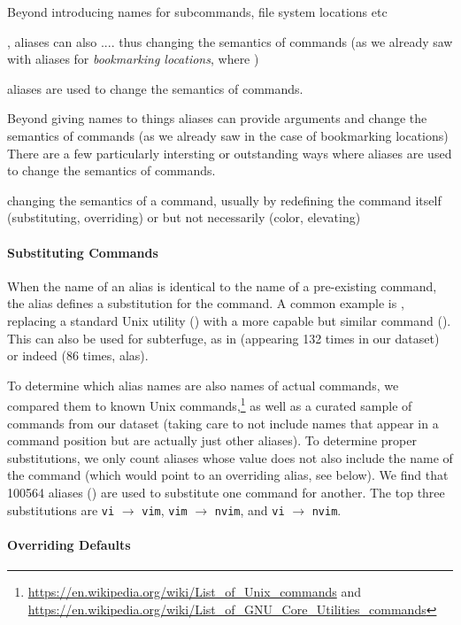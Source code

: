 Beyond introducing names for 
subcommands, file system locations etc

, aliases can also ....
thus changing the semantics of commands (as we already saw with aliases for \emph{bookmarking locations}, where )

aliases are used to change the semantics of commands.


Beyond giving names to things
aliases can provide arguments
and change the semantics of commands (as we already saw in the case of bookmarking locations)
There are a few particularly intersting or outstanding ways where aliases are used to change the semantics of commands.

\TODO changing the semantics of a command, usually by redefining the command itself (substituting, overriding) or but not necessarily (color, elevating)

\paragraph{\bf Substituting Commands}

When the name of an alias is identical to the name of a pre-existing command, the alias defines a substitution for the command.
A common example is , replacing a standard Unix utility () with a more capable but similar command ().
This can also be used for subterfuge, as in  (appearing 132 times in our dataset) or indeed  (86 times, alas).

To determine which alias names are also names of actual commands, we compared them to known Unix commands,\footnote{\url{https://en.wikipedia.org/wiki/List_of_Unix_commands} and \url{https://en.wikipedia.org/wiki/List_of_GNU_Core_Utilities_commands}} as well as a curated sample of commands from our dataset (taking care to not include names that appear in a command position but are actually just other aliases).
To determine proper substitutions, we only count aliases whose value does not also include the name of the command (which would point to an overriding alias, see below).
We find that \num{100564} aliases () are used to substitute one command for another.
The top three substitutions are \verb|vi| $\rightarrow$ \verb|vim|, \verb|vim| $\rightarrow$ \verb|nvim|, and \verb|vi| $\rightarrow$ \verb|nvim|.

\paragraph{\bf Overriding Defaults}

